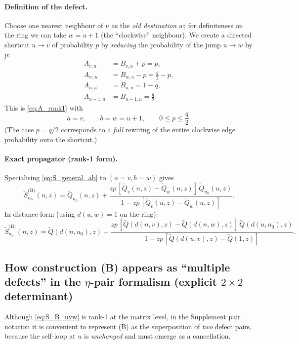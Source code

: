 \documentclass[11pt]{article}
\begin{document}
\paragraph{Definition of the defect.}
Choose one nearest neighbour of $u$ as the \emph{old destination} $w$; for definiteness on the ring we can take $w=u+1$
(the ``clockwise'' neighbour). We create a directed shortcut $u\to v$ of probability $p$ by \emph{reducing} the probability of the jump $u\to w$ by $p$:
\[
\begin{aligned}
A_{v,u} &= B_{v,u}+p=p,\\
A_{w,u} &= B_{w,u}-p=\frac q2-p,\\
A_{u,u} &= B_{u,u}=1-q,\\
A_{u-1,u} &= B_{u-1,u}=\frac q2.
\end{aligned}
\]
This is \eqref{eq:A_rank1} with
\[
a=v,\qquad b=w=u+1,\qquad 0\le p\le \frac q2.
\]
(The case $p=q/2$ corresponds to a \emph{full} rewiring of the entire clockwise edge probability onto the shortcut.)

\paragraph{Exact propagator (rank-1 form).}
Specialising \eqref{eq:S_general_ab} to $(a=v,b=w)$ gives
\begin{equation}
\boxed{
\tilde S^{\text{(B)}}_{n_0}(n,z)
=
\tilde Q_{n_0}(n,z)
+
\frac{z p\,[\tilde Q_v(n,z)-\tilde Q_w(n,z)]\,\tilde Q_{n_0}(u,z)}
{1-z p\,[\tilde Q_v(u,z)-\tilde Q_w(u,z)]}.
}
\label{eq:S_B_uvw}
\end{equation}
In distance form (using $d(u,w)=1$ on the ring):
\begin{equation}
\boxed{
\tilde S^{\text{(B)}}_{n_0}(n,z)
=
\tilde Q(d(n,n_0),z)
+
\frac{z p\,[\tilde Q(d(n,v),z)-\tilde Q(d(n,w),z)]\,\tilde Q(d(u,n_0),z)}
{1-z p\,[\tilde Q(d(u,v),z)-\tilde Q(1,z)]}.
}
\label{eq:S_B_dist}
\end{equation}

\subsection{How construction (B) appears as ``multiple defects'' in the $\eta$-pair formalism (explicit $2\times2$ determinant)}

Although \eqref{eq:S_B_uvw} is rank-1 at the matrix level, in the Supplement pair notation it is convenient to represent (B) as the superposition of \emph{two} defect pairs, because the self-loop at $u$ is \emph{unchanged} and must emerge as a cancellation.
\end{document}
